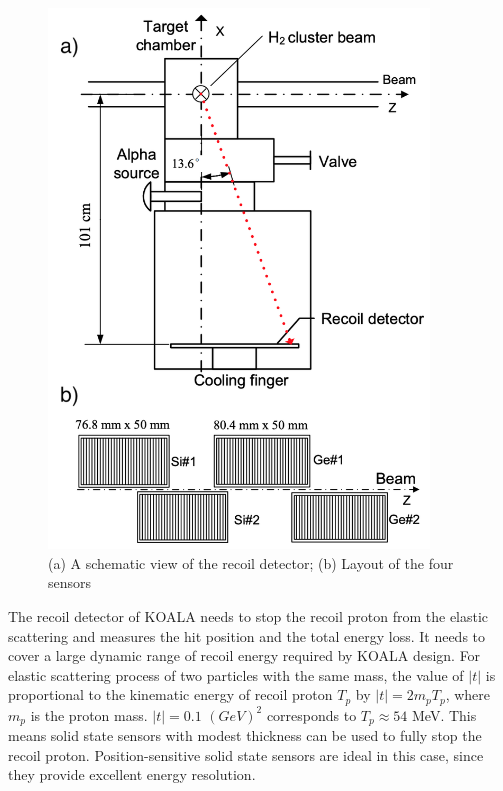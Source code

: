 \documentclass[number]{elsarticle}
\begin{document}
\begin{figure}[htbp]
\centering
\includegraphics[width=0.9\textwidth]{./recoil_schematic.png}
\caption{(a) A schematic view of the recoil detector; (b) Layout of the four sensors}
\label{fig:org9ed7981}
\end{figure}

The recoil detector of KOALA needs to stop the recoil proton from the elastic scattering and measures the hit position and the total energy loss.
It needs to cover a large dynamic range of recoil energy required by KOALA design.
For elastic scattering process of two particles with the same mass,
the value of \(|t|\) is proportional to the kinematic energy of recoil proton \(T_p\) by \(|t| = 2m_pT_p\), where \(m_p\) is the proton mass.
\(|t|=0.1\) \((GeV)^2\) corresponds to \(T_p \approx 54\) MeV. 
This means solid state sensors with modest thickness can be used to fully stop the recoil proton. 
Position-sensitive solid state sensors are ideal in this case, since they provide excellent energy resolution.
\end{document}
